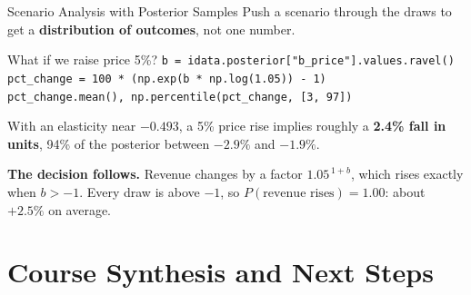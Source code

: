 \documentclass[aspectratio=169, 11pt]{beamer}
\begin{document}
\begin{frame}{Scenario Analysis with Posterior Samples}
  Push a scenario through the draws to get a \textbf{distribution of outcomes}, not one number.

  \begin{examplebox}{What if we raise price 5\%?}
    {\scriptsize\linespread{1.05}\selectfont
    \texttt{b = idata.posterior["b\_price"].values.ravel()}\\
    \texttt{pct\_change = 100 * (np.exp(b * np.log(1.05)) - 1)}\\[2pt]
    \texttt{pct\_change.mean(), np.percentile(pct\_change, [3, 97])}
    }
  \end{examplebox}

  With an elasticity near $-0.493$, a 5\% price rise implies roughly a \textbf{2.4\% fall in
  units}, 94\% of the posterior between $-2.9\%$ and $-1.9\%$.

  \vspace{0.1cm}
  \textbf{The decision follows.} Revenue changes by a factor $1.05^{\,1+b}$, which rises
  exactly when $b > -1$. Every draw is above $-1$, so $P(\text{revenue rises}) = 1.00$: about
  $+2.5\%$ on average.

\end{frame}

\section{Course Synthesis and Next Steps}

\end{document}
